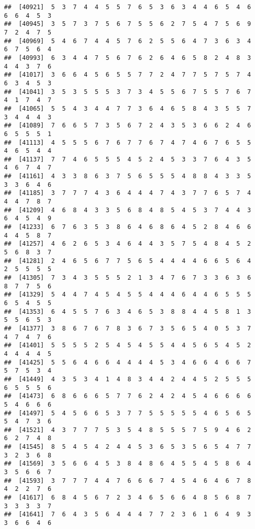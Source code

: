 \documentclass[
]{book}
\begin{document}
\begin{verbatim}
##  [40921]  5  3  7  4  4  5  5  7  6  5  3  6  3  4  4  6  5  4  6  6  6  4  5  3
##  [40945]  3  5  7  3  7  5  6  7  5  5  6  2  7  5  4  7  5  6  9  7  2  4  7  5
##  [40969]  5  4  6  7  4  4  5  7  6  2  5  5  6  4  7  3  6  3  4  6  7  5  6  4
##  [40993]  6  3  4  4  7  5  6  7  6  2  6  4  6  5  8  2  4  8  3  4  4  3  7  6
##  [41017]  3  6  6  4  5  6  5  5  7  7  2  4  7  7  5  7  5  7  4  6  3  4  5  3
##  [41041]  3  5  3  5  5  5  3  7  3  4  5  5  6  7  5  5  7  6  7  4  1  7  4  7
##  [41065]  5  5  4  3  4  4  7  7  3  6  4  6  5  8  4  3  5  5  7  3  4  4  4  3
##  [41089]  7  6  6  5  7  3  5  6  7  2  4  3  5  3  6  6  2  4  6  6  5  5  5  1
##  [41113]  4  5  5  5  6  7  6  7  7  6  7  4  7  4  6  7  6  5  5  4  6  5  4  4
##  [41137]  7  7  4  6  5  5  5  4  5  2  4  5  3  3  7  6  4  3  5  4  6  7  4  7
##  [41161]  4  3  3  8  6  3  7  5  6  5  5  5  4  8  8  4  3  3  5  3  3  6  4  6
##  [41185]  3  7  7  7  4  3  6  4  4  4  7  4  3  7  7  6  5  7  4  4  4  7  8  7
##  [41209]  4  6  8  4  3  3  5  6  8  4  8  5  4  5  3  7  4  4  3  6  4  5  4  9
##  [41233]  6  7  6  3  5  3  8  6  4  6  8  6  4  5  2  8  4  6  6  4  4  5  8  7
##  [41257]  4  6  2  6  5  3  4  6  4  4  3  5  7  5  4  8  4  5  2  5  6  8  3  7
##  [41281]  2  4  6  5  6  7  7  5  6  5  4  4  4  4  6  6  5  6  4  2  5  5  5  5
##  [41305]  7  3  4  3  5  5  5  2  1  3  4  7  6  7  3  3  6  3  6  8  7  7  5  6
##  [41329]  5  4  4  7  4  5  4  5  5  4  4  4  6  4  4  6  5  5  5  6  5  4  5  5
##  [41353]  6  4  5  5  7  6  3  4  6  5  3  8  8  4  4  5  8  1  3  5  5  6  5  3
##  [41377]  3  8  6  7  6  7  8  3  6  7  3  5  6  5  4  0  5  3  7  4  7  4  7  6
##  [41401]  5  5  5  5  2  5  4  5  4  5  5  4  4  5  6  5  4  5  2  4  4  4  4  5
##  [41425]  5  5  6  4  6  6  4  4  4  4  5  3  4  6  6  4  6  6  7  5  7  5  3  4
##  [41449]  4  3  5  3  4  1  4  8  3  4  4  2  4  4  5  2  5  5  5  6  5  5  5  6
##  [41473]  6  8  6  6  6  5  7  7  6  2  4  2  4  5  4  6  6  6  6  5  4  6  6  6
##  [41497]  5  4  5  6  6  5  3  7  7  5  5  5  5  5  4  6  5  6  5  5  4  7  3  6
##  [41521]  4  3  7  7  7  5  3  5  4  8  5  5  5  7  5  9  4  6  2  6  2  7  4  8
##  [41545]  8  5  4  5  4  2  4  4  5  3  6  5  3  5  6  5  4  7  7  3  2  3  6  8
##  [41569]  3  5  6  6  4  5  3  8  4  8  6  4  5  5  4  5  8  6  4  3  5  6  6  7
##  [41593]  3  7  7  7  4  4  7  6  6  6  7  4  5  4  6  4  6  7  8  4  2  2  7  6
##  [41617]  6  8  4  5  6  7  2  3  4  6  5  6  6  4  8  5  6  8  7  3  3  3  3  7
##  [41641]  7  6  4  3  5  6  4  4  4  7  7  2  3  6  1  6  4  9  3  3  6  6  4  6

\end{verbatim}
\end{document}
